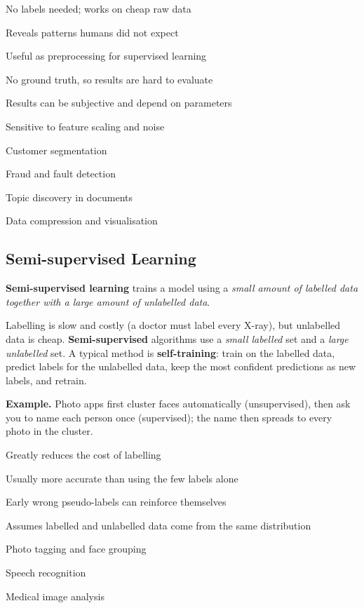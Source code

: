 {\item No labels needed; works on cheap raw data
 \item Reveals patterns humans did not expect
 \item Useful as preprocessing for supervised learning}
{\item No ground truth, so results are hard to evaluate
 \item Results can be subjective and depend on parameters
 \item Sensitive to feature scaling and noise}
{\item Customer segmentation
 \item Fraud and fault detection
 \item Topic discovery in documents
 \item Data compression and visualisation}

\subsection{Semi-supervised Learning}


\begin{definition}
\textbf{Semi-supervised learning} trains a model using a \emph{small amount of labelled data together with a large amount of unlabelled data}.
\end{definition}


Labelling is slow and costly (a doctor must label every X-ray), but unlabelled data is cheap. \textbf{Semi-supervised} algorithms use a \emph{small labelled} set and a \emph{large unlabelled} set. A typical method is \textbf{self-training}: train on the labelled data, predict labels for the unlabelled data, keep the most confident predictions as new labels, and retrain.

\textbf{Example.} Photo apps first cluster faces automatically (unsupervised), then ask you to name each person once (supervised); the name then spreads to every photo in the cluster.


{\item Greatly reduces the cost of labelling
 \item Usually more accurate than using the few labels alone}
{\item Early wrong pseudo-labels can reinforce themselves
 \item Assumes labelled and unlabelled data come from the same distribution}
{\item Photo tagging and face grouping
 \item Speech recognition
 \item Medical image analysis}

